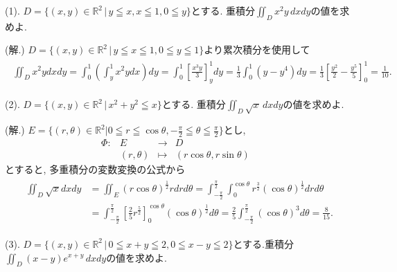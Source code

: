 \documentclass[dvipdfmx,a4paper,11pt]{article}
\newcommand{\R}{\mathbb{R}}
\theoremstyle{definition}
\begin{document}
 
{\large(1). $D=\{ (x,y) \in \R^2  \,|\,  y \leqq x, x \leqq 1, 0 \leqq y  \}$とする. 重積分$\iint_{D} x^2y \, dxdy$の値を求めよ.}\vspace{7pt}

\hspace{-11pt}(解.) $D=\{ (x,y) \in \R^2  \,|\,  y \leqq x \leqq 1, 0 \leqq y  \leqq 1 \}$より累次積分を使用して
\begin{align*}
\begin{split}
\iint_{D} x^2ydxdy 
= \int_{0}^{1} \left( \int_{y}^{1} x^2 y dx\right) dy 
= \int_{0}^{1}\left[  \frac{x^3y}{3}\right]_{y}^{1} dy
=  \frac{1}{3}\int_{0}^{1}  (y - y^4)     dy
= \frac{1}{3}\left[  \frac{y^2}{2} - \frac{y^5}{5}   \right]_{0}^{1} = \frac{1}{10}.
\end{split}
\end{align*}

{\large(2). $D=\{ (x,y) \in \R^2 \,|\, x^2 + y^2 \leqq x\}$とする.
重積分$\iint_{D} \sqrt{x}\,dxdy$の値を求めよ.}\vspace{7pt}

\hspace{-11pt}(解.) $E= \{ (r ,\theta) \in \R^2  | 0 \leqq r \leqq \cos \theta, 
 -\frac{\pi}{2}\leqq \theta  \leqq\frac{\pi}{2}\}$とし, 
 $$
\begin{array}{ccccc}
\Phi: &E & \rightarrow & D& \\
&(r,\theta) & \longmapsto & (r \cos \theta , r \sin \theta)&
\end{array}
$$
とすると, 多重積分の変数変換の公式から
\begin{align*}
\begin{split}
\iint_{D} \sqrt{x}dxdy
&=
\iint_{E}  (r\cos \theta)^{\frac{1}{2}} rdrd\theta 
= \int_{- \frac{\pi}{2}}^{\frac{\pi}{2}} 
 \int_{0}^{\cos \theta} r^{\frac{3}{2}} (\cos \theta)^{\frac{1}{2}} drd\theta \\
&=
\int_{- \frac{\pi}{2}}^{\frac{\pi}{2}}
 \left[ \frac{2}{5}r^{\frac{5}{2}} \right]_{0}^{\cos \theta}  (\cos \theta)^{\frac{1}{2}}  d\theta 
=\frac{2}{5} \int_{- \frac{\pi}{2}}^{\frac{\pi}{2}} (\cos \theta)^{3} d\theta 
=\frac{8}{15}.
    \end{split}
  \end{align*}
\vspace{7pt}

{\large(3). $D=\{ (x,y) \in \R^2 \,|\, 0 \leqq x+y \leqq 2, 0 \leqq x-y \leqq 2\}$とする.重積分$\iint_{D} (x-y)e^{x+y}\,dxdy$の値を求めよ.}\vspace{7pt}
\end{document}

